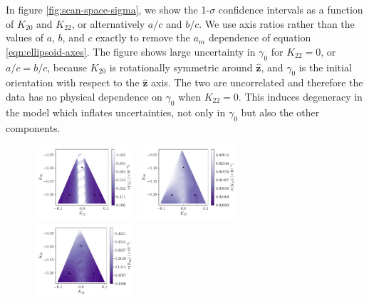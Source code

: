 \documentclass[fleqn,usenatbib]{mnras}
\newcommand{\unit}[1]{\bm{\hat{#1}}}
\begin{document}
In figure \ref{fig:scan-space-sigma}, we show the 1-$\sigma$ confidence intervals as a function of $K_{20}$ and $K_{22}$, or alternatively $a/c$ and $b/c$. We use axis ratios rather than the values of $a$, $b$, and $c$ exactly to remove the $a_m$ dependence of equation \ref{eqn:ellipsoid-axes}. The figure shows large uncertainty in $\gamma_0$ for $K_{22}=0$, or $a/c=b/c$, because $K_{20}$ is rotationally symmetric around $\unit z$, and $\gamma_0$ is the initial orientation with respect to the $\unit z$ axis. The two are uncorrelated and therefore the data has no physical dependence on $\gamma_0$ when $K_{22}=0$. This induces degeneracy in the model which inflates uncertainties, not only in $\gamma_0$ but also the other components.

\begin{figure}
  \includegraphics[width=0.33\textwidth]{figs/probe-space-theta-1-sigma.pdf}\hfill
  \includegraphics[width=0.33\textwidth]{figs/probe-space-theta-2-sigma.pdf}\hfill
  \includegraphics[width=0.33\textwidth]{figs/probe-space-theta-3-sigma.pdf}


\end{figure}
\end{document}

